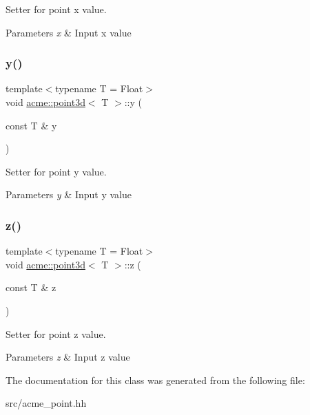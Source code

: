 Setter for point x value. 


\begin{DoxyParams}{Parameters}
{\em x} & Input x value \\
\hline
\end{DoxyParams}
\mbox{\label{classacme_1_1point3d_ad9b058b4ba5ca4172a8c4ded27c89825}} 
\subsubsection{\texorpdfstring{y()}{y()}}
{\footnotesize\ttfamily template$<$typename T = Float$>$ \\
void \hyperlink{classacme_1_1point3d}{acme\+::point3d}$<$ T $>$\+::y (\begin{DoxyParamCaption}\item[{const T \&}]{y }\end{DoxyParamCaption})\hspace{0.3cm}{\ttfamily [inline]}}



Setter for point y value. 


\begin{DoxyParams}{Parameters}
{\em y} & Input y value \\
\hline
\end{DoxyParams}
\mbox{\label{classacme_1_1point3d_aad69f4d32ffafffd008214c361fa843f}} 
\subsubsection{\texorpdfstring{z()}{z()}}
{\footnotesize\ttfamily template$<$typename T = Float$>$ \\
void \hyperlink{classacme_1_1point3d}{acme\+::point3d}$<$ T $>$\+::z (\begin{DoxyParamCaption}\item[{const T \&}]{z }\end{DoxyParamCaption})\hspace{0.3cm}{\ttfamily [inline]}}



Setter for point z value. 


\begin{DoxyParams}{Parameters}
{\em z} & Input z value \\
\hline
\end{DoxyParams}


The documentation for this class was generated from the following file\+:\begin{DoxyCompactItemize}
\item 
src/acme\+\_\+point.\+hh\end{DoxyCompactItemize}

